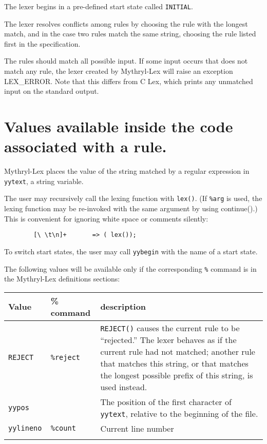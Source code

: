 The lexer begins in a pre-defined start state called \verb|INITIAL|.

The lexer resolves conflicts among rules by choosing the rule with
the longest match, and in the case two rules match the same string,
choosing the rule listed first in the specification.

The rules should match all possible input.  If some input occurs that
does not match any rule, the lexer created by Mythryl-Lex will raise an
exception LEX_ERROR.  Note that this differs from C Lex, which prints
any unmatched input on the standard output.

\section{Values available inside the code associated with a rule.}
\label{avail}

Mythryl-Lex places the value of the string matched by a regular expression
in \verb|yytext|, a string variable.  

The user may recursively
call the lexing function with \verb|lex()|.  (If \verb|%arg| is used, the
lexing function may be re-invoked with the same argument by using
continue().) This is convenient for ignoring white space or comments silently:

\begin{verbatim}
        [\ \t\n]+       => ( lex());
\end{verbatim}

To switch start states, the user may call \verb|yybegin| with the name of a
start state.

The following values will be available only if the corresponding \verb|%|
command is in the Mythryl-Lex definitions sections:

\begin{tabular}{lll}
\\
{\bf Value}&{\bf \% command}&{\bf description}\\
\hline
{\tt REJECT} &{\tt\%reject}&\parbox[t]{2.6in}{{\tt REJECT()} causes the current
					rule to be ``rejected.''
					The lexer behaves as if the
					current rule had not matched;
					another rule that matches this
					string, or that matches the longest
					possible prefix of this string,
					is used instead.} \\
{\tt yypos} & & \parbox[t]{2.6in}{The position of the first character
of {\tt yytext}, relative to the beginning of the file.}\\
{\tt yylineno } & {\tt \%count} &         Current line number\\
\\
\end{tabular}
        

